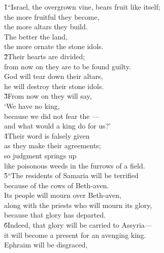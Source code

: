 \begin{poetry}
\poeml {}
\v{1}``Israel, the overgrown vine, bears fruit like itself; \\
\poeml the more fruitful they become, \\
\poemlll       the more altars they build. \\
\poeml The better the land, \\
\poemll    the more ornate the stone idols. \\
\poeml \v{2}Their hearts are divided; \\
\poemll    from now on they are to be found guilty. \\
\poeml God will tear down their altars, \\
\poemll    he will destroy their stone idols. \\
\poeml \v{3}From now on they will say, \\
\poemll    `We have no king, \\
\poemlll       because we did not fear the --- \\
\poemll    and what would a king do for us?' \\
\poeml \v{4}Their word is falsely given \\
\poemll    as they make their agreements; \\
\poeml so judgment springs up \\
\poemll    like poisonous weeds in the furrows of a field. \\
\poeml \v{5}``The residents of Samaria will be terrified \\
\poemll    because of the cows of Beth-aven. \\
\poeml Its people will mourn over Beth-aven, \\
\poemll    along with the priests who will mourn its glory, \\
\poemlll       because that glory has departed. \\
\poeml \v{6}Indeed, that glory will be carried to Assyria--- \\
\poemll    it will become a present for an avenging king. \\
\poeml Ephraim will be disgraced, \\

\end{poetry}
